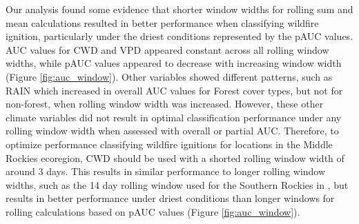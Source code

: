 \documentclass[11p]{article}
\begin{document}
Our analysis found some evidence that shorter window widths for rolling sum and mean calculations resulted in better performance when classifying wildfire ignition, particularly under the driest conditions represented by the pAUC values. AUC values for CWD and VPD appeared constant across all rolling window widths, while pAUC values appeared to decrease with increasing window width (Figure \ref{fig:auc_window}). Other variables showed different patterns, such as RAIN which increased in overall AUC values for Forest cover types, but not for non-forest, when rolling window width was increased. However, these other climate variables did not result in optimal classification performance under any rolling window width when assessed with overall or partial AUC. Therefore, to optimize performance classifying wildfire ignitions for locations in the Middle Rockies ecoregion, CWD should be used with a shorted rolling window width of around 3 days. This results in similar performance to longer rolling window widths, such as the 14 day rolling window used for the Southern Rockies in  \citet{thomaWaterBalanceIndicator2020}, but results in better performance under driest conditions than longer windows for rolling calculations based on pAUC values (Figure \ref{fig:auc_window}).
\end{document}
